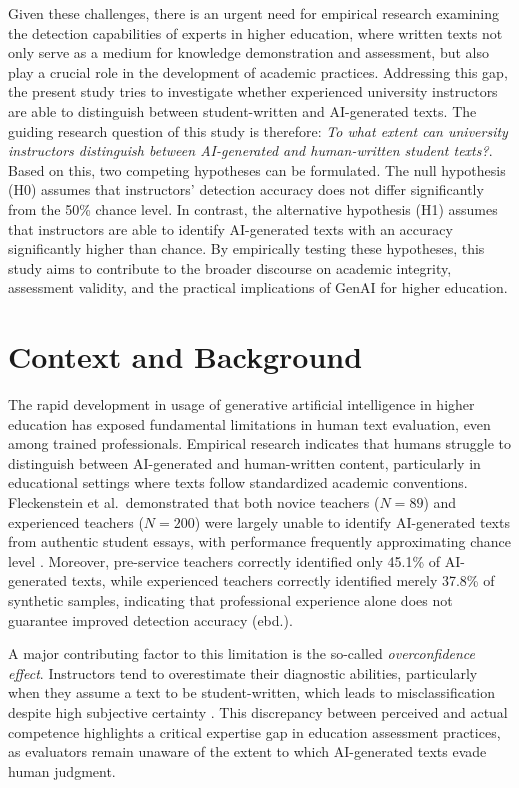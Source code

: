 \documentclass[12pt]{article}
\begin{document}
Given these challenges, there is an urgent need for empirical research examining the detection capabilities of experts in higher education, where written texts not only serve as a medium for knowledge demonstration and assessment, but also play a crucial role in the development of academic practices. Addressing this gap, the present study tries to investigate whether experienced university instructors are able to distinguish between student-written and AI-generated texts. The guiding research question of this study is therefore: \textit{To what extent can university instructors distinguish between AI-generated and human-written student texts?}. Based on this, two competing hypotheses can be formulated. The null hypothesis (H0) assumes that instructors' detection accuracy does not differ significantly from the 50\% chance level. In contrast, the alternative hypothesis (H1) assumes that instructors are able to identify AI-generated texts with an accuracy significantly higher than chance. By empirically testing these hypotheses, this study aims to contribute to the broader discourse on academic integrity, assessment validity, and the practical implications of GenAI for higher education. 

\newpage
\section{Context and Background}

The rapid development in usage of generative artificial intelligence in higher education has exposed fundamental limitations in human text evaluation, even among trained professionals. Empirical research indicates that humans struggle to distinguish between AI-generated and human-written content, particularly in educational settings where texts follow standardized academic conventions. Fleckenstein et al.\ demonstrated that both novice teachers ($N = 89$) and experienced teachers ($N = 200$) were largely unable to identify AI-generated texts from authentic student essays, with performance frequently approximating chance level \autocite[1]{fleckenstein_teachers_2024}. Moreover, pre-service teachers correctly identified only 45.1\% of AI-generated texts, while experienced teachers correctly identified merely 37.8\% of synthetic samples, indicating that professional experience alone does not guarantee improved detection accuracy (ebd.).

A major contributing factor to this limitation is the so-called \emph{overconfidence effect}. Instructors tend to overestimate their diagnostic abilities, particularly when they assume a text to be student-written, which leads to misclassification despite high subjective certainty \autocite[1]{fleckenstein_teachers_2024}. This discrepancy between perceived and actual competence highlights a critical expertise gap in education assessment practices, as evaluators remain unaware of the extent to which AI-generated texts evade human judgment.
\end{document}
